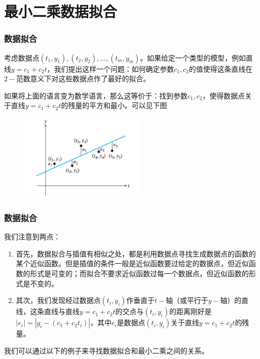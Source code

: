 \documentclass[10pt]{beamer}
\begin{document}

\section{最小二乘数据拟合}

\begin{frame}
\frametitle{数据拟合}
考虑数据点$(t_1,y_1), (t_2, y_2), \ldots, (t_m, y_m)$。如果给定一个类型的模型，例如直线$y = c_1 + c_2 t$，我们提出这样一个问题：如何确定参数$c_1, c_2$的值使得这条直线在$2-$范数意义下对这些数据点作了最好的拟合。

\vspace{0.2cm}

如果将上面的语言变为数学语言，那么这等价于：找到参数$c_1, c_2$，使得数据点关于直线$y = c_1 + c_2 t$的残量的平方和最小。可以见下图
\begin{figure}
\includegraphics[width=6cm]{figs/4-1-2_Fitting_Data-1} 
\end{figure}
\end{frame}


\begin{frame}
\frametitle{数据拟合}
我们注意到两点：
\begin{enumerate}
\item 首先，数据拟合与插值有相似之处，都是利用数据点寻找生成数据点的函数的某个近似函数。但是插值的条件一般是近似函数要过给定的数据点，但近似函数的形式是可变的；而拟合不要求近似函数过每一个数据点，但近似函数的形式是不变的。
\item 其次，我们发现经过数据点$(t_i, y_i)$作垂直于$t-$轴（或平行于$y-$轴）的直线，这条直线与直线$y = c_1 + c_2t$的交点与$(t_i, y_i)$的距离刚好是$|e_i| = |y_i - (c_1 + c_2 t_i)|$，其中$e_i$是数据点$(t_i, y_i)$关于直线$y = c_1 + c_2 t$的残量。
\end{enumerate}

我们可以通过以下的例子来寻找数据拟合和最小二乘之间的关系。
\end{frame}
\end{document}
